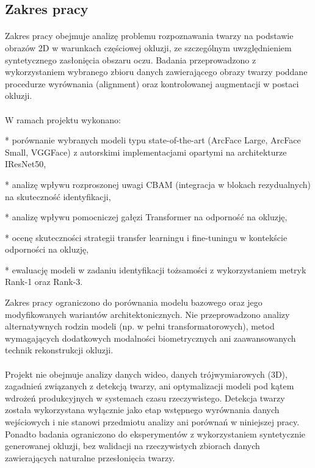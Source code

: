 \subsection{Zakres pracy}

\paragraph{}Zakres pracy obejmuje analizę problemu rozpoznawania twarzy na podstawie obrazów 2D w warunkach częściowej okluzji, ze szczególnym uwzględnieniem syntetycznego zasłonięcia obszaru oczu. Badania przeprowadzono z wykorzystaniem wybranego zbioru danych zawierającego obrazy twarzy poddane procedurze wyrównania (alignment) oraz kontrolowanej augmentacji w postaci okluzji.

\paragraph{}W ramach projektu wykonano:

* porównanie wybranych modeli typu state-of-the-art (ArcFace Large, ArcFace Small, VGGFace) z autorskimi implementacjami opartymi na architekturze IResNet50,

* analizę wpływu rozproszonej uwagi CBAM (integracja w blokach rezydualnych) na skuteczność identyfikacji,

* analizę wpływu pomocniczej gałęzi Transformer na odporność na okluzję,

* ocenę skuteczności strategii transfer learningu i fine-tuningu w kontekście odporności na okluzję,

* ewaluację modeli w zadaniu identyfikacji tożsamości z wykorzystaniem metryk Rank-1 oraz Rank-3.

Zakres pracy ograniczono do porównania modelu bazowego oraz jego modyfikowanych wariantów architektonicznych. Nie przeprowadzono analizy alternatywnych rodzin modeli (np. w pełni transformatorowych), metod wymagających dodatkowych modalności biometrycznych ani zaawansowanych technik rekonstrukcji okluzji.

\paragraph{}Projekt nie obejmuje analizy danych wideo, danych trójwymiarowych (3D), zagadnień związanych z detekcją twarzy, ani optymalizacji modeli pod kątem wdrożeń produkcyjnych w systemach czasu rzeczywistego. Detekcja twarzy została wykorzystana wyłącznie jako etap wstępnego wyrównania danych wejściowych i nie stanowi przedmiotu analizy ani porównań w niniejszej pracy. Ponadto badania ograniczono do eksperymentów z wykorzystaniem syntetycznie generowanej okluzji, bez walidacji na rzeczywistych zbiorach danych zawierających naturalne przesłonięcia twarzy.